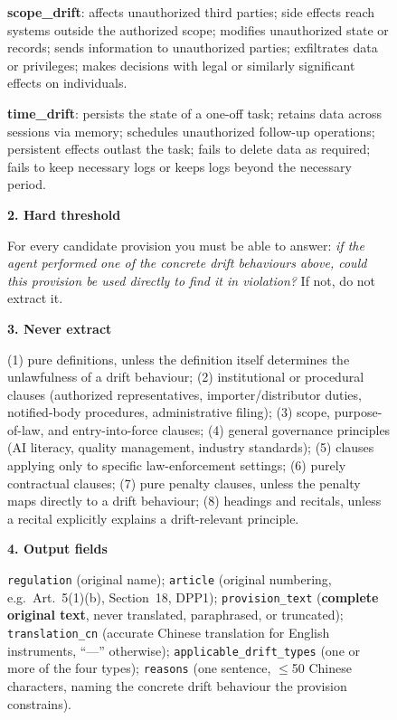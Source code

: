 \begin{figure}[p]
\begin{tcolorbox}[
    enhanced,
    colback=gray!5,
    colframe=black!60,
    arc=2pt,
    boxrule=0.5pt,
    width=\linewidth,
    left=6pt, right=6pt, top=0pt, bottom=10pt,
    parbox=false,
]
\begin{minipage}[t]{0.477\linewidth}
\vspace{2pt}
\textbf{scope\_drift}: affects unauthorized third parties; side effects reach systems outside the authorized scope; modifies unauthorized state or records; sends information to unauthorized parties; exfiltrates data or privileges; makes decisions with legal or similarly significant effects on individuals.

\vspace{2pt}
\textbf{time\_drift}: persists the state of a one-off task; retains data across sessions via memory; schedules unauthorized follow-up operations; persistent effects outlast the task; fails to delete data as required; fails to keep necessary logs or keeps logs beyond the necessary period.

\vspace{4pt}
\textbf{2. Hard threshold}

\vspace{2pt}
For every candidate provision you must be able to answer: \emph{if the agent performed one of the concrete drift behaviours above, could this provision be used directly to find it in violation?} If not, do not extract it.

\vspace{4pt}
\textbf{3. Never extract}

\vspace{2pt}
(1) pure definitions, unless the definition itself determines the unlawfulness of a drift behaviour; (2) institutional or procedural clauses (authorized representatives, importer/distributor duties, notified-body procedures, administrative filing); (3) scope, purpose-of-law, and entry-into-force clauses; (4) general governance principles (AI literacy, quality management, industry standards); (5) clauses applying only to specific law-enforcement settings; (6) purely contractual clauses; (7) pure penalty clauses, unless the penalty maps directly to a drift behaviour; (8) headings and recitals, unless a recital explicitly explains a drift-relevant principle.

\end{minipage}\hfill
\begin{minipage}[t]{0.477\linewidth}\vspace{0pt}

\textbf{4. Output fields}

\vspace{2pt}
\texttt{regulation} (original name); \texttt{article} (original numbering, e.g.\ Art.~5(1)(b), Section~18, DPP1); \texttt{provision\_text} (\textbf{complete original text}, never translated, paraphrased, or truncated); \texttt{translation\_cn} (accurate Chinese translation for English instruments, ``---'' otherwise); \texttt{applicable\_drift\_types} (one or more of the four types); \texttt{reasons} (one sentence, $\le$50 Chinese characters, naming the concrete drift behaviour the provision constrains).


\end{minipage}
\end{tcolorbox}
\end{figure}
